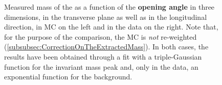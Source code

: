 \begin{figure}[!p]
\hspace*{-2.cm}
\hspace*{-2.cm}
\hspace*{-2.cm}
\caption{Measured mass of the \rmLambda as a function of the \textbf{opening angle} in three dimensions, in the transverse plane as well as in the longitudinal direction, in MC on the left and in the data on the right. Note that, for the purpose of the comparison, the MC is \textit{not} re-weighted (\Sec\ref{subsubsec:CorrectionOnTheExtractedMass}). In both cases, the results have been obtained through a fit with a triple-Gaussian function for the invariant mass peak and, only in the data, an exponential function for the background.}
	\label{fig:MassVsOpeningAngleLambda}
\end{figure}


